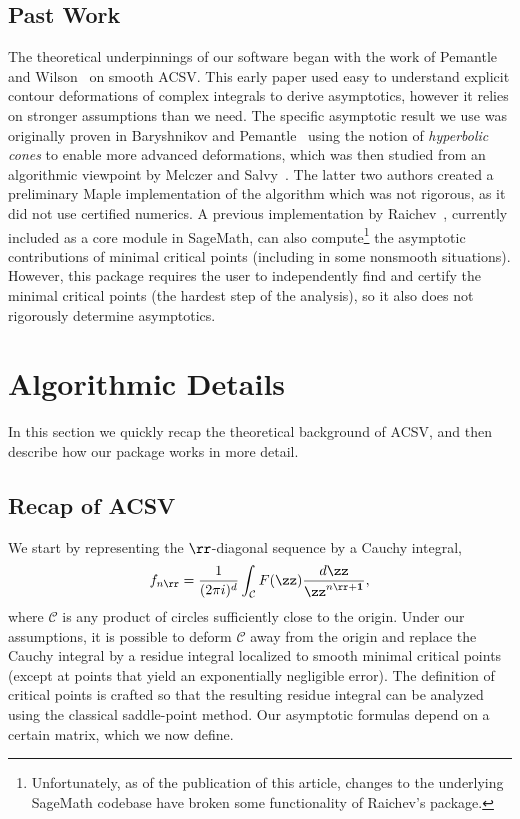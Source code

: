 \documentclass[a4paper]{amsart}
\theoremstyle{definition}
\def\one{\mathbf{1}} %
\begin{document}
\subsection{Past Work}

The theoretical underpinnings of our software began with the work of Pemantle and Wilson~\cite{PemantleWilson2002} on smooth ACSV. This early paper used easy to understand explicit contour deformations of complex integrals to derive asymptotics, however it relies on stronger assumptions than we need. The specific asymptotic result we use was originally proven in Baryshnikov and Pemantle~\cite{BaryshnikovPemantle2011} using the notion of \emph{hyperbolic cones} to enable more advanced deformations, which was then studied from an algorithmic viewpoint by Melczer and Salvy~\cite{MelczerSalvy2021}. The latter two authors created a preliminary Maple implementation of the algorithm which was not rigorous, as it did not use certified numerics. 
A previous implementation by Raichev~\cite{Raichev2011}, currently included as a core module in SageMath,
can also compute\footnote{Unfortunately, as of the publication of this article, changes to the underlying SageMath codebase have broken some functionality of Raichev's package.} the asymptotic contributions of minimal critical points (including in some nonsmooth situations). However, this package requires the user to independently find and certify the minimal critical points (the hardest step of the analysis), so it also does not rigorously determine asymptotics. 

\section{Algorithmic Details}

In this section we quickly recap the theoretical background of ACSV, and then describe how our package works in more detail.

\subsection{Recap of ACSV}

We start by representing the $\rr$-diagonal sequence by a Cauchy integral,
\[ f_{n\rr} = \frac{1}{(2\pi i)^d} \int_{\mathcal{C}} F(\zz) \frac{d\zz}{\zz^{n\rr+\one}}, \]
where $\mathcal{C}$ is any product of circles sufficiently close to the origin. Under our assumptions, it is possible to deform $\mathcal{C}$ away from the origin and replace the Cauchy integral by a residue integral localized to smooth minimal critical points (except at points that yield an exponentially negligible error). The definition of critical points is crafted so that the resulting residue integral can be analyzed using the classical saddle-point method. Our asymptotic formulas depend on a certain matrix, which we now define.
\end{document}
